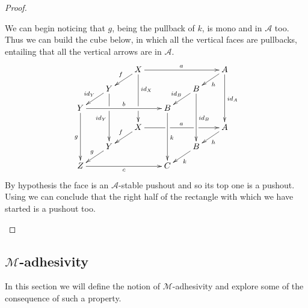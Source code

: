 \documentclass[a4paper,UKenglish,cleveref,pdftex, thm-restate,numberwithinsect]{lipics}
\newcommand{\id}[1]{\mathsf{id}_{#1}}
\def\Y{\textbf {\textup{Y}}}
\begin{document}
\begin{proof}\begin{proofEnd}
		We can begin noticing that $g$, being the pullback of $k$, is mono and in $\mathcal{A}$ too. Thus we can build the cube below, in which all the vertical faces are pullbacks, entailing that all the vertical arrows are in $\mathcal{A}$.
		\[\xymatrix@C=20pt@R=10pt{ & &X\ar[dl]_{f} \ar[ddd]^(.333333){\id{X}}|(.666666)\hole\ar[rrr]^{a} &&&A \ar[ddd]^{\id{A}} \ar[dl]^{h}\\& Y\ar[dl]_{\id{Y}} \ar[ddd]|(.333333)\hole_{\id{Y}} &&&B \ar[ddd]^{\id{B}} \ar[dl]_{\id{B}} \\Y \ar[ddd]_{g} \ar[rrr]^{b}&&& B\ar[ddd]^{k}\\&&X \ar[rrr]|(.34)\hole^{a}|(.67)\hole \ar[dl]_{f}&&& A \ar[dl]^{h}\\ & Y  \ar[dl]_{g}&&& B \ar[dl]^{k}\\ Z\ar[rrr]_{c} &&& C}\]
		By hypothesis the face is an $\mathcal{A}$-stable pushout and so its top one is a pushout. Using  we can conclude that the right half of the rectangle with which we have started is a pushout too.
	\end{proofEnd} 
\end{proof}

\subsection{$\mathcal{M}$-adhesivity}

In this section we will define the notion of $\mathcal{M}$-adhesivity \cite{azzi2019essence,ehrig2012,ehrig2014adhesive,heindel2009category,lack2005adhesive} and explore some of the consequence of such a property. 
\end{document}
